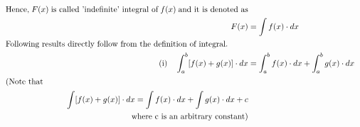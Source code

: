 \documentclass{article}
\begin{document}
\begin{align*}
    \text{Hence,} \; F(x) \; \text{is called 'indefinite' integral of} \; f(x) \; \text{and it is denoted as} \\
    F(x) &= \int f(x) \cdot dx \\
    \intertext{Following results directly follow from the definition of integral.}
    \text{(i)} \quad \int_a^b [f(x) + g(x)] \cdot dx &= \int_a^b f(x) \cdot dx + \int_a^b g(x) \cdot dx \\
    \intertext{(Note that} \; \int [f(x) + g(x)] \cdot dx = \int f(x) \cdot dx + \int g(x) \cdot dx + c \\ \text{where c is an arbitrary constant})
\end{align*}
\end{document}
